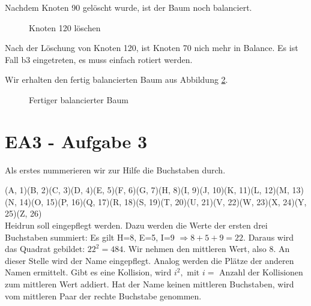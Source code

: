 \documentclass[12pt]{article}
\begin{document}
Nachdem Knoten 90 gelöscht wurde, ist der Baum noch balanciert.

\begin{figure}[h]
	\centering
	\scalebox{.5}{}
	\caption{Knoten 120 löschen}
	\label{fig:abb11b}
\end{figure}

Nach der Löschung von Knoten 120, ist Knoten 70 nich mehr in Balance. Es ist Fall b3 eingetreten,
es muss einfach rotiert werden.

\newpage

Wir erhalten den fertig balancierten Baum aus Abbildung \ref{fig:abb12b}.

\begin{figure}[h]
	\centering
	\scalebox{.5}{}
	\caption{Fertiger balancierter Baum}
	\label{fig:abb12b}
\end{figure}



\section*{EA3 - Aufgabe 3}
Als erstes nummerieren wir zur Hilfe die Buchstaben durch.

(A, 1)(B, 2)(C, 3)(D, 4)(E, 5)(F, 6)(G, 7)(H, 8)(I, 9)(J, 10)(K, 11)(L, 12)(M, 13)(N, 14)(O, 15)(P, 16)(Q, 17)(R, 18)(S, 19)(T, 20)(U, 21)(V, 22)(W, 23)(X, 24)(Y, 25)(Z, 26)
\\

Heidrun soll eingepflegt werden. Dazu werden die Werte der ersten drei Buchstaben summiert: Es gilt H=8, E=5, I=9 $\Rightarrow 8 + 5 + 9 = 22$. Daraus wird das Quadrat gebildet:
$22^2=484$. Wir nehmen den mittleren Wert, also 8. An dieser Stelle wird der Name eingepflegt. Analog werden die Plätze der anderen Namen ermittelt. Gibt es eine Kollision,
wird $i^2, \text{ mit } i = \text{ Anzahl der Kollisionen}$ zum mittleren Wert addiert. Hat der Name keinen mittleren Buchstaben, wird vom mittleren Paar der rechte
Buchstabe genommen.
\end{document}
